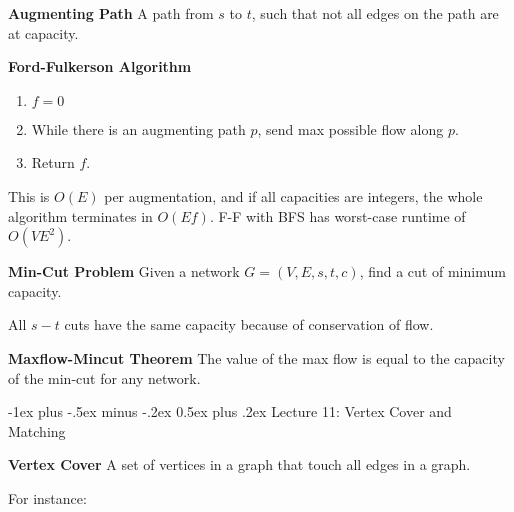 \documentclass[10pt,landscape]{article}
\makeatletter
\renewcommand{\section}{\@startsection{section}{1}{0mm}%
                                {-1ex plus -.5ex minus -.2ex}%
                                {0.5ex plus .2ex}%
                                {\normalfont\large\bfseries}}
\newcommand{\definition}[1]{\textbf{#1}\hspace{2pt}}
\makeatother
\begin{document}
\begin{multicols}{3}
\definition{Augmenting Path} A path from $s$ to $t$, such that not all edges on the path are at capacity.

\definition{Ford-Fulkerson Algorithm}

\begin{enumerate}
\item $f = 0$
\item While there is an augmenting path $p$, send max possible flow along $p$.
\item Return $f$.
\end{enumerate}

This is $O(E)$ per augmentation, and if all capacities are integers, the whole algorithm terminates in $O(Ef)$. F-F with BFS has worst-case runtime of $O(VE^2)$.

\definition{Min-Cut Problem} Given a network $G = (V, E, s, t, c)$, find a cut of minimum capacity.

All $s-t$ cuts have the same capacity because of conservation of flow.

\definition{Maxflow-Mincut Theorem} The value of the max flow is equal to the capacity of the min-cut for any network.

\section{Lecture 11: Vertex Cover and Matching}

\definition{Vertex Cover}  A set of vertices in a graph that touch all edges in a graph.

For instance:

\begin{center}
\end{center}


\end{multicols}
\end{document}

